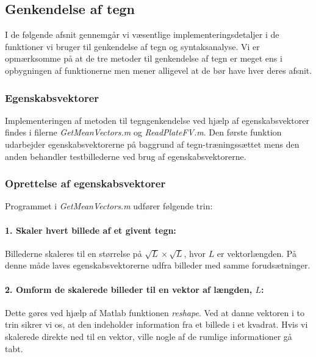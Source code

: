 
\subsection{Genkendelse af tegn}

I de følgende afsnit gennemgår vi væsentlige implementeringsdetaljer i de funktioner vi bruger til genkendelse af tegn og syntaksanalyse. Vi er opmærksomme på at de tre metoder til genkendelse af tegn er meget ens i opbygningen af funktionerne men mener alligevel at de bør have hver deres afsnit.

\subsubsection{Egenskabsvektorer}

Implementeringen af metoden til tegngenkendelse ved hjælp af egenskabsvektorer findes i filerne \textit{GetMeanVectors.m} og \textit{ReadPlateFV.m}. Den første funktion udarbejder egenskabsvektorerne på baggrund af tegn-træningssættet mens den anden behandler testbillederne ved brug af egenskabsvektorerne.

\subsubsection*{Oprettelse af egenskabsvektorer}

Programmet i \textit{GetMeanVectors.m} udfører følgende trin:

\paragraph{1. Skaler hvert billede af et givent tegn:} Billederne skaleres til en størrelse på $\sqrt{L} \times \sqrt{L}$, hvor $L$ er vektorlængden. På denne måde laves egenskabsvektorerne udfra billeder med samme forudsætninger.

\paragraph{2. Omform de skalerede billeder til en vektor af længden, $L$:} Dette gøres ved hjælp af Matlab funktionen \textit{reshape}. Ved at danne vektoren i to trin sikrer vi os, at den indeholder information fra et billede i et kvadrat. Hvis vi skalerede direkte ned til en vektor, ville nogle af de rumlige informationer gå tabt.

